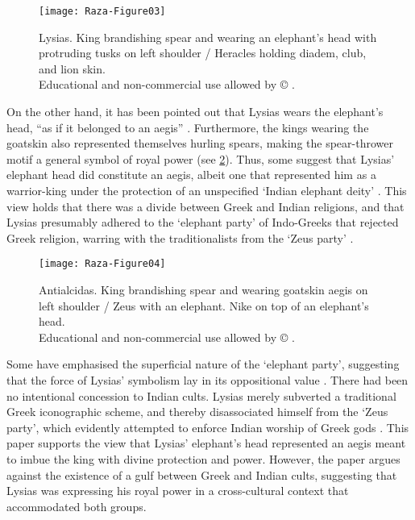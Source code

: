 \documentclass{ijsra}
\def\coinindia{Educational and non-commercial use allowed by © \cite{Coin}.}
\begin{document}
\begin{figure}[!htb] %
	\centering
	\texttt{[image: Raza-Figure03]}
	\caption{Lysias. King brandishing spear and wearing an elephant’s head with protruding tusks on left shoulder / Heracles holding diadem, club, and lion skin. 
		{\normalfont\scriptsize \\ \coinindia}}
	\label{fig:Raza-Figure03}
\end{figure}

On the other hand, it has been pointed out that Lysias wears the elephant’s head, “as if it belonged to an aegis” \parencite[86]{Bopearachchi1990}.
Furthermore, the kings wearing the goatskin also represented themselves hurling spears, making the spear-thrower motif a general symbol of royal power (see \cref{fig:Raza-Figure04}).
Thus, some suggest that Lysias’ elephant head did constitute an aegis, albeit one that represented him as a warrior-king under the protection of an unspecified ‘Indian elephant deity’ \parencite[35]{Whitehead1970}.
This view holds that there was a divide between Greek and Indian religions, and that Lysias presumably adhered to the ‘elephant party’ of Indo-Greeks that rejected Greek religion, warring with the traditionalists from the ‘Zeus party’ \parencites[94]{Whitehead1970}[26]{Widemann2007}.

\begin{figure}[!htb] %
	\centering
	\texttt{[image: Raza-Figure04]}
	\caption{Antialcidas. King brandishing spear and wearing goatskin aegis on left shoulder / Zeus with an elephant. Nike on top of an elephant’s head.
		{\normalfont\scriptsize \\ \coinindia}}
	\label{fig:Raza-Figure04}
\end{figure}
 
Some have emphasised the superficial nature of the ‘elephant party’, suggesting that the force of Lysias’ symbolism lay in its oppositional value \parencite[114]{Widemann2003}.
There had been no intentional concession to Indian cults. Lysias merely subverted a traditional Greek iconographic scheme, and thereby disassociated himself from the ‘Zeus party’, which evidently attempted to enforce Indian worship of Greek gods \parencite[26]{Widemann2007}.
This paper supports the view that Lysias’ elephant’s head represented an aegis meant to imbue the king with divine protection and power.
However, the paper argues against the existence of a gulf between Greek and Indian cults, suggesting that Lysias was expressing his royal power in a cross-cultural context that accommodated both groups.
  
\end{document}

